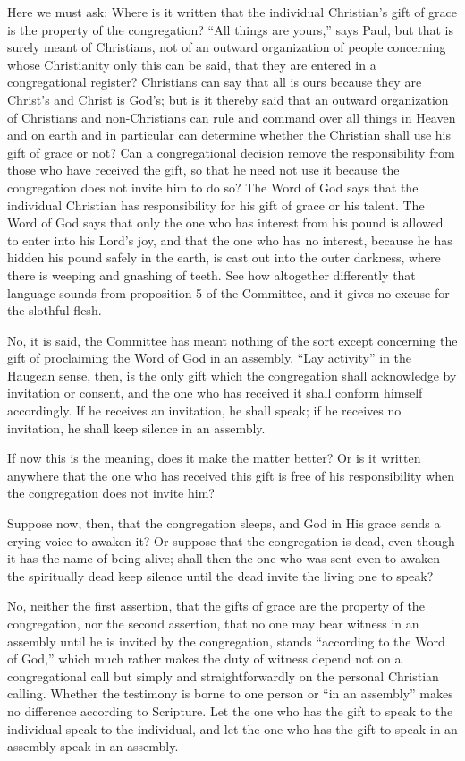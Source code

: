 Here we must ask: Where is it written that the individual Christian’s gift of grace is the property of the congregation? “All things are yours,” says Paul, but that is surely meant of Christians, not of an outward organization of people concerning whose Christianity only this can be said, that they are entered in a congregational register? Christians can say that all is ours because they are Christ’s and Christ is God’s; but is it thereby said that an outward organization of Christians and non-Christians can rule and command over all things in Heaven and on earth and in particular can determine whether the Christian shall use his gift of grace or not? Can a congregational decision remove the responsibility from those who have received the gift, so that he need not use it because the congregation does not invite him to do so? The Word of God says that the individual Christian has responsibility for his gift of grace or his talent. The Word of God says that only the one who has interest from his pound is allowed to enter into his Lord’s joy, and that the one who has no interest, because he has hidden his pound safely in the earth, is cast out into the outer darkness, where there is weeping and gnashing of teeth. See how altogether differently that language sounds from proposition 5 of the Committee, and it gives no excuse for the slothful flesh.

No, it is said, the Committee has meant nothing of the sort except concerning the gift of proclaiming the Word of God in an assembly. “Lay activity” in the Haugean sense, then, is the only gift which the congregation shall acknowledge by invitation or consent, and the one who has received it shall conform himself accordingly. If he receives an invitation, he shall speak; if he receives no invitation, he shall keep silence in an assembly.

If now this is the meaning, does it make the matter better? Or is it written anywhere that the one who has received this gift is free of his responsibility when the congregation does not invite him?

Suppose now, then, that the congregation sleeps, and God in His grace sends a crying voice to awaken it? Or suppose that the congregation is dead, even though it has the name of being alive; shall then the one who was sent even to awaken the spiritually dead keep silence until the dead invite the living one to speak?

No, neither the first assertion, that the gifts of grace are the property of the congregation, nor the second assertion, that no one may bear witness in an assembly until he is invited by the congregation, stands “according to the Word of God,” which much rather makes the duty of witness depend not on a congregational call but simply and straightforwardly on the personal Christian calling. Whether the testimony is borne to one person or “in an assembly” makes no difference according to Scripture. Let the one who has the gift to speak to the individual speak to the individual, and let the one who has the gift to speak in an assembly speak in an assembly.


